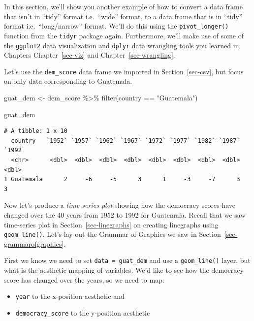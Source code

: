 \documentclass[
  letterpaper,
  DIV=11,
  numbers=noendperiod]{scrreprt}
\newenvironment{Shaded}{\begin{snugshade}}{\end{snugshade}}
\newcommand{\FunctionTok}[1]{\textcolor[rgb]{0.28,0.35,0.67}{#1}}
\newcommand{\NormalTok}[1]{\textcolor[rgb]{0.00,0.23,0.31}{#1}}
\newcommand{\OtherTok}[1]{\textcolor[rgb]{0.00,0.23,0.31}{#1}}
\newcommand{\SpecialCharTok}[1]{\textcolor[rgb]{0.37,0.37,0.37}{#1}}
\newcommand{\StringTok}[1]{\textcolor[rgb]{0.13,0.47,0.30}{#1}}
\providecommand{\tightlist}{%
  \setlength{\itemsep}{0pt}\setlength{\parskip}{0pt}}\usepackage{longtable,booktabs,array}
\theoremstyle{definition}
\theoremstyle{remark}
\begin{document}
In this section, we'll show you another example of how to convert a data
frame that isn't in ``tidy'' format i.e.~``wide'' format, to a data
frame that is in ``tidy'' format i.e.~``long/narrow'' format. We'll do
this using the \texttt{pivot\_longer()} function from the \texttt{tidyr}
package again. Furthermore, we'll make use of some of the
\texttt{ggplot2} data visualization and \texttt{dplyr} data wrangling
tools you learned in Chapters Chapter~\ref{sec-viz} and
Chapter~\ref{sec-wrangling}.

Let's use the \texttt{dem\_score} data frame we imported in
Section~\ref{sec-csv}, but focus on only data corresponding to
Guatemala.

\begin{Shaded}
\begin{Highlighting}[]
\NormalTok{guat\_dem }\OtherTok{\textless{}{-}}\NormalTok{ dem\_score }\SpecialCharTok{\%\textgreater{}\%} 
  \FunctionTok{filter}\NormalTok{(country }\SpecialCharTok{==} \StringTok{"Guatemala"}\NormalTok{)}

\NormalTok{guat\_dem}
\end{Highlighting}
\end{Shaded}

\begin{verbatim}
# A tibble: 1 x 10
  country   `1952` `1957` `1962` `1967` `1972` `1977` `1982` `1987` `1992`
  <chr>      <dbl>  <dbl>  <dbl>  <dbl>  <dbl>  <dbl>  <dbl>  <dbl>  <dbl>
1 Guatemala      2     -6     -5      3      1     -3     -7      3      3
\end{verbatim}

Now let's produce a \emph{time-series plot} showing how the democracy
scores have changed over the 40 years from 1952 to 1992 for Guatemala.
Recall that we saw time-series plot in Section~\ref{sec-linegraphs} on
creating linegraphs using \texttt{geom\_line()}. Let's lay out the
Grammar of Graphics we saw in Section~\ref{sec-grammarofgraphics}.

First we know we need to set \texttt{data\ =\ guat\_dem} and use a
\texttt{geom\_line()} layer, but what is the aesthetic mapping of
variables. We'd like to see how the democracy score has changed over the
years, so we need to map:

\begin{itemize}
\tightlist
\item
  \texttt{year} to the x-position aesthetic and
\item
  \texttt{democracy\_score} to the y-position aesthetic
\end{itemize}
\end{document}
